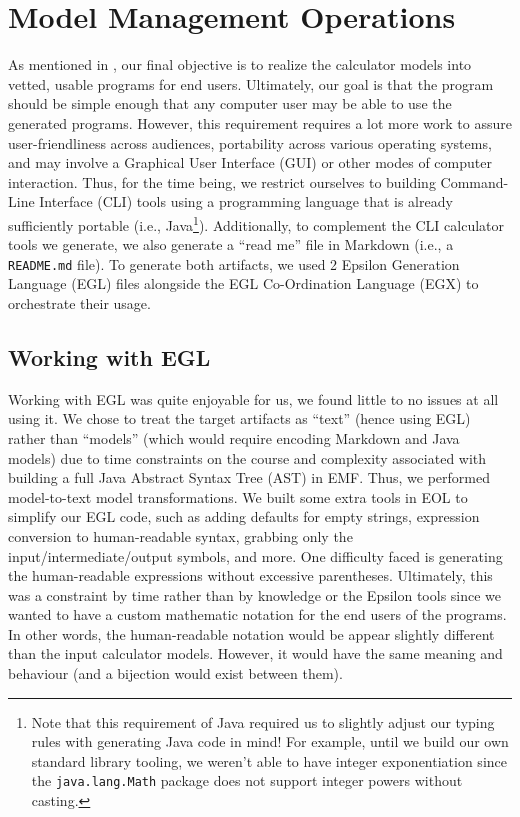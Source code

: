 \documentclass[11pt,fleqn]{article}
\begin{document}
\section{Model Management Operations}
\label{sec:model-management-operations}

As mentioned in , our final objective is
to realize the calculator models into vetted, usable programs for end users.
Ultimately, our goal is that the program should be simple enough that any
computer user may be able to use the generated programs. However, this
requirement requires a lot more work to assure user-friendliness across
audiences, portability across various operating systems, and may involve a
Graphical User Interface (GUI) or other modes of computer interaction. Thus, for
the time being, we restrict ourselves to building Command-Line Interface (CLI)
tools using a programming language that is already sufficiently portable (i.e.,
Java\footnote{Note that this requirement of Java required us to slightly adjust
our typing rules with generating Java code in mind! For example, until we build
our own standard library tooling, we weren't able to have integer exponentiation
since the \lstinline{java.lang.Math} package does not support integer powers
without casting.}). Additionally, to complement the CLI calculator tools we
generate, we also generate a ``read me'' file in Markdown (i.e., a
\lstinline{README.md} file). To generate both artifacts, we used 2 Epsilon
Generation Language (EGL) files alongside the EGL Co-Ordination Language (EGX)
to orchestrate their usage.

\subsection{Working with EGL}
\label{sec:model-management-operations:subsec:working-with-egl}

Working with EGL was quite enjoyable for us, we found little to no issues at all
using it. We chose to treat the target artifacts as ``text'' (hence using EGL)
rather than ``models'' (which would require encoding Markdown and Java models)
due to time constraints on the course and complexity associated with building a
full Java Abstract Syntax Tree (AST) in EMF. Thus, we performed model-to-text
model transformations. We built some extra tools in EOL to simplify our EGL
code, such as adding defaults for empty strings, expression conversion to
human-readable syntax, grabbing only the input/intermediate/output symbols, and
more. One difficulty faced is generating the human-readable expressions without
excessive parentheses. Ultimately, this was a constraint by time rather than by
knowledge or the Epsilon tools since we wanted to have a custom mathematic
notation for the end users of the programs. In other words, the human-readable
notation would be appear slightly different than the input calculator models.
However, it would have the same meaning and behaviour (and a bijection would
exist between them).
\end{document}
